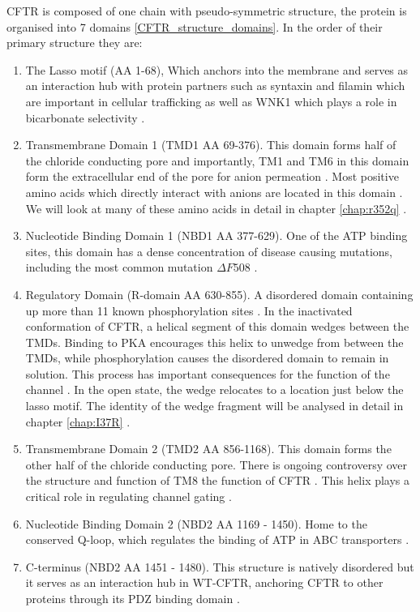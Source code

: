 CFTR is composed of one chain with pseudo-symmetric structure, the protein is organised into 7 domains \ref{CFTR_structure_domains}. In the order of their primary structure they are: 
\begin{enumerate}
	\item The Lasso motif (AA 1-68), Which anchors into the membrane and serves as an interaction hub with protein partners such as syntaxin and filamin which are important in cellular trafficking \cite{cormet-boyaka2002, naren1998, thelin2007} as well as WNK1 which plays a role in bicarbonate selectivity \cite{kim2019}. 
	\item Transmembrane Domain 1 (TMD1 AA 69-376). This domain forms half of the chloride conducting pore and importantly, TM1 and TM6 in this domain form the extracellular end of the pore for anion permeation \cite{linsdell2006, linsdell2022}. Most positive amino acids which directly interact with anions are located in this domain \cite{linsdell2018}. We will look at many of these amino acids in detail in chapter \ref{chap:r352q} \cite{wong2022a}. 
	\item Nucleotide Binding Domain 1 (NBD1 AA 377-629). One of the ATP binding sites, this domain has a dense concentration of disease causing mutations, including the most common mutation $\Delta F508$ \cite{cftr2}.
	\item Regulatory Domain (R-domain AA 630-855). A disordered domain containing up more than 11 known phosphorylation sites \cite{mihalyi2020}. In the inactivated conformation of CFTR, a helical segment of this domain wedges between the TMDs. Binding to PKA encourages this helix to unwedge from between the TMDs, while phosphorylation causes the disordered domain to remain in solution. This process has important consequences for the function of the channel \cite{ostedgaard2000, mihalyi2020}. In the open state, the wedge relocates to a location just below the lasso motif. The identity of the wedge fragment will be analysed in detail in chapter \ref{chap:I37R} \cite{wong2022}. 

	\item Transmembrane Domain 2 (TMD2 AA 856-1168). This domain forms the other half of the chloride conducting pore. There is ongoing controversy over the structure and function of TM8 the function of CFTR \cite{hegedus2022, liu2019}. This helix plays a critical role in regulating channel gating \cite{negoda2019}.
	\item Nucleotide Binding Domain 2 (NBD2 AA 1169 - 1450). Home to the conserved Q-loop, which regulates the binding of ATP in ABC transporters \cite{ivey2020, zolnerciks2014, dong2015}.
	\item C-terminus (NBD2 AA 1451 - 1480). This structure is natively disordered but it serves as an interaction hub in WT-CFTR, anchoring CFTR to other proteins through its PDZ binding domain \cite{moyer1999, cushing2008}. 

\end{enumerate}


